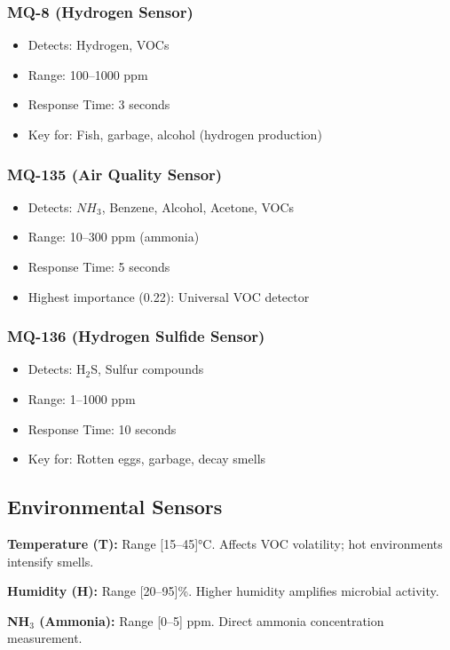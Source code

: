 \documentclass[10pt]{article}
\begin{document}
\subsubsection{MQ-8 (Hydrogen Sensor)}
\begin{itemize}
    \item Detects: Hydrogen, VOCs
    \item Range: 100–1000 ppm
    \item Response Time: 3 seconds
    \item Key for: Fish, garbage, alcohol (hydrogen production)
\end{itemize}

\subsubsection{MQ-135 (Air Quality Sensor)}
\begin{itemize}
    \item Detects: $NH_3$, Benzene, Alcohol, Acetone, VOCs
    \item Range: 10–300 ppm (ammonia)
    \item Response Time: 5 seconds
    \item Highest importance (0.22): Universal VOC detector
\end{itemize}

\subsubsection{MQ-136 (Hydrogen Sulfide Sensor)}
\begin{itemize}
    \item Detects: H$_2$S, Sulfur compounds
    \item Range: 1–1000 ppm
    \item Response Time: 10 seconds
    \item Key for: Rotten eggs, garbage, decay smells
\end{itemize}

\subsection{Environmental Sensors}

\textbf{Temperature (T):} Range [15–45]°C. Affects VOC volatility; hot environments intensify smells.

\textbf{Humidity (H):} Range [20–95]\%. Higher humidity amplifies microbial activity.

\textbf{NH$_3$ (Ammonia):} Range [0–5] ppm. Direct ammonia concentration measurement.
\end{document}
